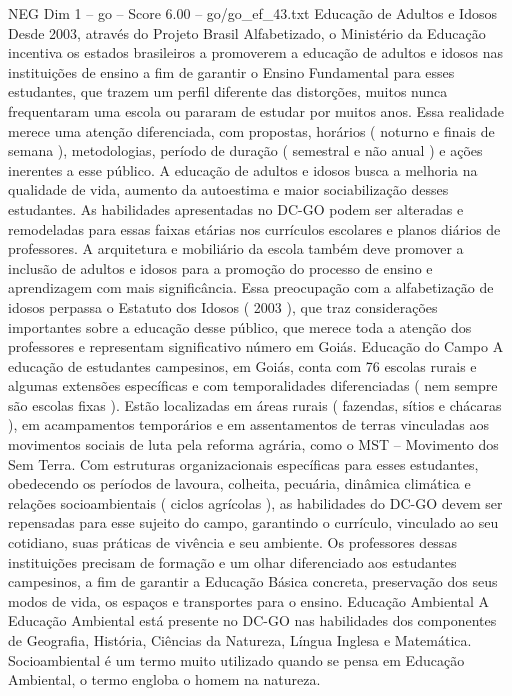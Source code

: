\begin{textsample}{NEG Dim 1 – go – Score 6.00 – go/go\_ef\_43.txt}  \label{ex:f1_neg_200}
Educação de Adultos e Idosos Desde 2003, através do Projeto Brasil Alfabetizado, o Ministério da Educação incentiva os estados brasileiros a promoverem a educação de adultos e idosos nas instituições de ensino a fim de garantir o Ensino Fundamental para esses estudantes, que trazem um perfil diferente das distorções, muitos nunca frequentaram uma escola ou pararam de estudar por muitos anos.
Essa realidade merece uma atenção diferenciada, com propostas, horários ( noturno e finais de semana ), metodologias, período de duração ( semestral e não anual ) e ações inerentes a esse público.
A educação de adultos e idosos busca a melhoria na qualidade de vida, aumento da autoestima e maior sociabilização desses estudantes.
As habilidades apresentadas no DC-GO podem ser alteradas e remodeladas para essas faixas etárias nos currículos escolares e planos diários de professores.
A arquitetura e mobiliário da escola também deve promover a inclusão de adultos e idosos para a promoção do processo de ensino e aprendizagem com mais significância.
Essa preocupação com a alfabetização de idosos perpassa o Estatuto dos Idosos ( 2003 ), que traz considerações importantes sobre a educação desse público, que merece toda a atenção dos professores e representam significativo número em Goiás.
Educação do Campo A educação de estudantes campesinos, em Goiás, conta com 76 escolas rurais e algumas extensões específicas e com temporalidades diferenciadas ( nem sempre são escolas fixas ).
Estão localizadas em áreas rurais ( fazendas, sítios e chácaras ), em acampamentos temporários e em assentamentos de terras vinculadas aos movimentos sociais de luta pela reforma agrária, como o MST – Movimento dos Sem Terra.
Com estruturas organizacionais específicas para esses estudantes, obedecendo os períodos de lavoura, colheita, pecuária, dinâmica climática e relações socioambientais ( ciclos agrícolas ), as habilidades do DC-GO devem ser repensadas para esse sujeito do campo, garantindo o currículo, vinculado ao seu cotidiano, suas práticas de vivência e seu ambiente.
Os professores dessas instituições precisam de formação e um olhar diferenciado aos estudantes campesinos, a fim de garantir a Educação Básica concreta, preservação dos seus modos de vida, os espaços e transportes para o ensino.
Educação Ambiental A Educação Ambiental está presente no DC-GO nas habilidades dos componentes de Geografia, História, Ciências da Natureza, Língua Inglesa e Matemática.
Socioambiental é um termo muito utilizado quando se pensa em Educação Ambiental, o termo engloba o homem na natureza.

\end{textsample}
